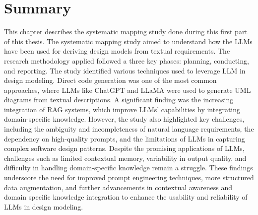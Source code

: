 \section{Summary}
This chapter describes the systematic mapping study done during this first part of this thesis. The systematic mapping study aimed to understand how the LLMs have been used for deriving design models from textual requirements. The research methodology applied followed a three key phases: planning, conducting, and reporting.
The study identified various techniques used to leverage LLM in design modeling. Direct code generation was one of the most common approaches, where LLMs like ChatGPT and LLaMA were used to generate UML diagrams from textual descriptions. A significant finding was the increasing integration of RAG systems, which improve LLMs' capabilities by integrating domain-specific knowledge. However, the study also highlighted key challenges, including the ambiguity and incompleteness of natural language requirements, the dependency on high-quality prompts, and the limitations of LLMs in capturing complex software design patterns.
Despite the promising applications of LLMs, challenges such as limited contextual memory, variability in output quality, and difficulty in handling domain-specific knowledge remain a struggle. These findings underscore the need for improved prompt engineering techniques, more structured data augmentation, and further advancements in contextual awareness and domain specific knowledge integration to enhance the usability and reliability of LLMs in design modeling.